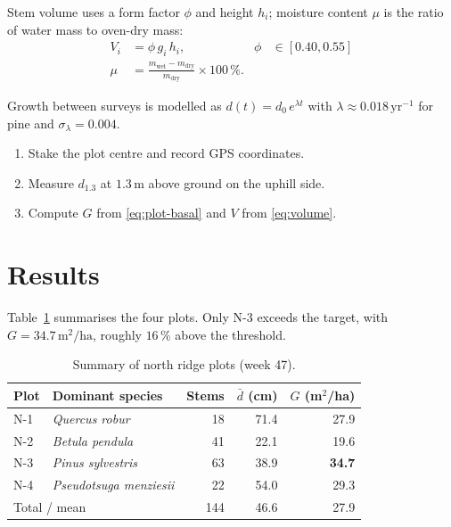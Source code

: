 \documentclass[11pt, a4paper]{article}
\newcommand{\unit}[1]{\,\mathrm{#1}}
\newcommand{\dbh}{\ensuremath{d_{1.3}}}
\begin{document}
Stem volume uses a form factor $\phi$ and height $h_i$; moisture content $\mu$ is the ratio of water mass to oven-dry mass:
\begin{align}
  V_i &= \phi \, g_i \, h_i, & \phi &\in [0.40, 0.55] \label{eq:volume} \\
  \mu &= \frac{m_\text{wet} - m_\text{dry}}{m_\text{dry}} \times 100\,\%. \label{eq:moisture}
\end{align}

Growth between surveys is modelled as $d(t) = d_0 \, e^{\lambda t}$ with $\lambda \approx 0.018\unit{yr^{-1}}$ for pine and $\sigma_\lambda = 0.004$.

\begin{enumerate}
  \item Stake the plot centre and record GPS coordinates.
  \item Measure \dbh{} at $1.3\unit{m}$ above ground on the uphill side.
  \item Compute $G$ from \eqref{eq:plot-basal} and $V$ from \eqref{eq:volume}.
\end{enumerate}

\section{Results}
\label{sec:results}

Table~\ref{tab:plots} summarises the four plots. Only N-3 exceeds the target, with $G = 34.7\unit{m^2/ha}$, roughly $16\,\%$ above the threshold.

\begin{table}[htbp]
  \centering
  \caption{Summary of north ridge plots (week 47).}
  \label{tab:plots}
  \begin{tabular}{l l r r r}
    \toprule
    Plot & Dominant species & Stems & $\bar{d}$ (cm) & $G$ (m$^2$/ha) \\
    \midrule
    N-1 & \emph{Quercus robur}      & 18 & 71.4 & 27.9 \\
    N-2 & \emph{Betula pendula}     & 41 & 22.1 & 19.6 \\
    N-3 & \emph{Pinus sylvestris}   & 63 & 38.9 & \textbf{34.7} \\
    N-4 & \emph{Pseudotsuga menziesii} & 22 & 54.0 & 29.3 \\
    \midrule
    \multicolumn{2}{l}{Total / mean} & 144 & 46.6 & 27.9 \\
    \bottomrule
  \end{tabular}
\end{table}
\end{document}
